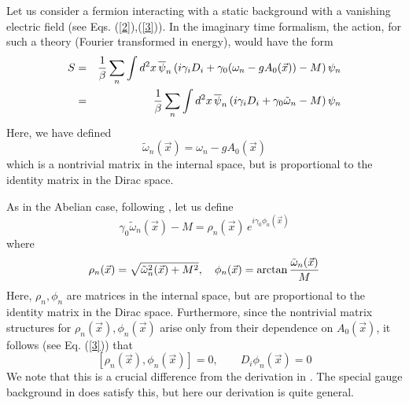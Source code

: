 \documentclass[a4paper,12pt]{article}
\begin{document}
Let us consider a fermion interacting with a static background with a
vanishing electric field (see Eqs. (\ref{2}),(\ref{3})). In the
imaginary  time formalism, the action, for such a theory (Fourier
transformed in energy), would have the form
\begin{eqnarray}
S & = & {1\over \beta} \sum_{n} \int d^{2}x\,
\overline{\psi}_{n}\left(i\gamma_{i}D_{i} +
  \gamma_{0}(\omega_{n}- gA_{0}(\vec{x})) - M\right)\psi_{n}\nonumber\\
 & = & {1\over \beta} \sum_{n} \int d^{2}x\,\overline{\psi}_{n}
 \left(i\gamma_{i}D_{i} + \gamma_{0}\tilde{\omega}_{n} -
   M\right)\psi_{n}\label{10}
\end{eqnarray}
Here, we have defined
\begin{equation}
\tilde{\omega}_{n}(\vec{x}) = \omega_{n} - g A_{0}(\vec{x})\label{11}
\end{equation}
which is a nontrivial matrix in the internal space, but is
proportional to the identity matrix in the Dirac space.

As in the Abelian case, following \cite{fosco:1997ei,fosco:1997vu},
let us define
\begin{equation}
\gamma_{0}\tilde{\omega}_{n}(\vec{x}) - M =
\rho_{n}(\vec{x})\,e^{i\gamma_{0}\phi_{n}(\vec{x})}\label{12}
\end{equation}
where
\begin{equation}
\rho_{n}(\vec{x}) = \sqrt{\tilde{\omega}_{n}^{2}(\vec{x}) +
  M^{2}},\quad \phi_{n}(\vec{x}) = \arctan
  {\tilde{\omega}_{n}(\vec{x})\over M}\label{13}
\end{equation}
Here, $\rho_{n},\phi_{n}$ are matrices in the internal space, but are
proportional to the identity matrix in the Dirac space. Furthermore,
since the nontrivial matrix structures for
$\rho_{n}(\vec{x}),\phi_{n}(\vec{x})$ arise  only from their
dependence on $A_{0}(\vec{x})$, it follows (see Eq. (\ref{3})) that
\begin{equation}
\left[\rho_{n}(\vec{x}),\phi_{n}(\vec{x})\right] = 0,\qquad
D_{i}\phi_{n}(\vec{x}) = 0\label{14}
\end{equation}
We note that this is a crucial difference from the derivation in
\cite{fosco:1997vu}.
The special gauge background in \cite{fosco:1997vu}
does satisfy this, but here our derivation is quite general.
\end{document}
